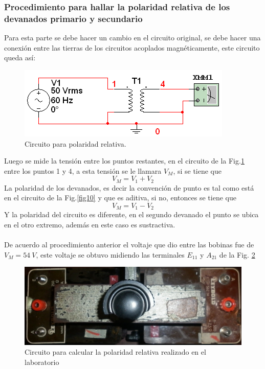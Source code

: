 \documentclass[twocolumn]{IEEEtran}
\begin{document}
\subsubsection{Procedimiento para hallar la polaridad relativa de los devanados primario y secundario}
\noindent
Para esta parte se debe hacer un cambio en el circuito original, se debe hacer una conexión entre las tierras de los circuitos acoplados magnéticamente, este circuito queda así:
\begin{figure}[H]
	\centering
		\includegraphics[scale=0.6]{circ3.PNG}
	\caption{Circuito para polaridad relativa.}
	\label{fig12}
\end{figure}
\noindent
Luego se mide la tensión entre los puntos restantes, en el circuito de la Fig.\ref{fig12} entre los puntos 1 y 4, a esta tensión se le llamara $V_M$, si se tiene que
\begin{equation}
 V_M=V_1+V_2
\label{ecu54}
\end{equation}
\noindent
La polaridad de los devanados, es decir la convención de punto es tal como está en el circuito de la Fig.\ref{fig10} y que es aditiva, si no, entonces se tiene que
\begin{equation}
 V_M=V_1-V_2
\label{ecu53}
\end{equation}
\noindent
Y la polaridad del circuito es diferente, en el segundo devanado el punto se ubica en el otro extremo, además en este caso es sustractiva.\\\\
De acuerdo al procedimiento anterior el voltaje que dio entre las bobinas fue de $V_M = 54\ V$, este voltaje se obtuvo midiendo las terminales $E_{11}$ y $A_{21}$ de la Fig. \ref{fig21}\\
\begin{figure}[H]
	\centering
		\includegraphics[scale=0.15]{432.png}
	\caption{Circuito para calcular la polaridad relativa realizado en el laboratorio}
	\label{fig21}
\end{figure}
\end{document}
